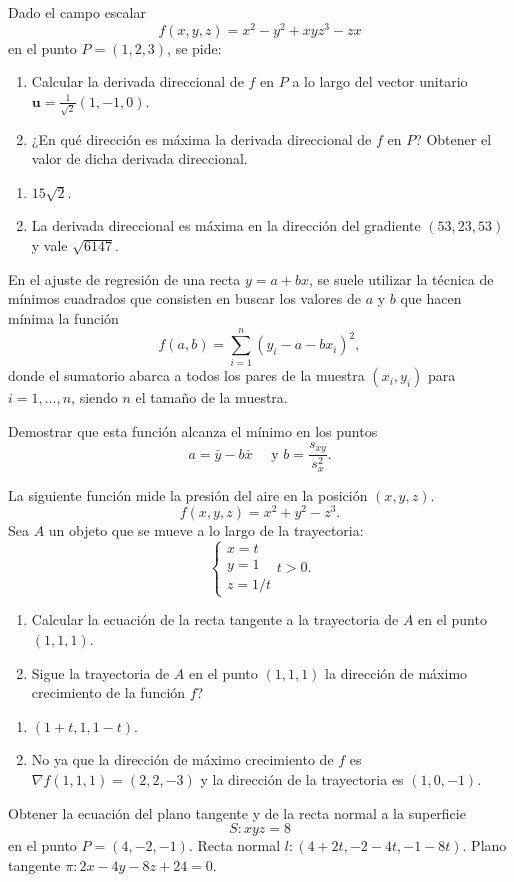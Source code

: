 {Dado el campo escalar
\[
f(x,y,z) = x^2-y^2+xyz^3-zx
\]
en el punto $P=(1,2,3)$, se pide:
\begin{enumerate}
\item Calcular la derivada direccional de $f$ en $P$ a lo largo del vector unitario $\mathbf{u}=\frac{1}{\sqrt2}(1,-1,0)$.
\item ¿En qué dirección es máxima la derivada direccional de $f$ en $P$? Obtener el valor de dicha derivada direccional.
\end{enumerate}
}
{\begin{enumerate}
\item $15\sqrt{2}$.
\item La derivada direccional es máxima en la dirección del gradiente $(53,23,53)$ y vale $\sqrt{6147}$.
\end{enumerate}
}
{
}


{En el ajuste de regresión de una recta $y=a+bx$, se suele utilizar la técnica de mínimos cuadrados que consisten en buscar los valores
de $a$ y $b$ que hacen mínima la función
\[
f(a,b)= \sum_{i=1}^{n}(y_i-a-bx_i)^2,
\]
donde el sumatorio abarca a todos los pares de la muestra $(x_i,y_i)$ para $i=1,\ldots, n$, siendo $n$ el tamaño de la muestra.

Demostrar que esta función alcanza el mínimo en los puntos
\[
a=\bar y-b\bar x \quad \mbox{ y } b=\frac{s_{xy}}{s_x^2}.
\]
}
{
}
{
}


{La siguiente función mide la presión del aire en la posición $(x,y,z)$.
\[
f(x,y,z)= x^2+y^2-z^3.
\]
Sea $A$ un objeto que se mueve a lo largo de la trayectoria:
\[
\begin{cases}
x=t\\
y=1\\
z=1/t
\end{cases}
t>0.
\]
\begin{enumerate}
\item Calcular la ecuación de la recta tangente a la trayectoria de $A$ en el punto $(1,1,1)$.
\item Sigue la trayectoria de $A$ en el punto $(1,1,1)$ la dirección de máximo crecimiento de la función $f$?
\end{enumerate}
}
{\begin{enumerate}
\item $(1+t, 1, 1-t)$.
\item No ya que la dirección de máximo crecimiento de $f$ es $\nabla f(1,1,1)=(2,2,-3)$ y la dirección de la trayectoria es $(1,0,-1)$.
\end{enumerate}
}
{
}


{Obtener la ecuación del plano tangente y de la recta normal a la superficie
\[
S:xyz=8
\]
en el punto $P=(4,-2,-1)$.
}
{Recta normal $l:(4+2t,-2-4t,-1-8t)$. Plano tangente $\pi: 2x-4y-8z+24=0$.
}
{
}


